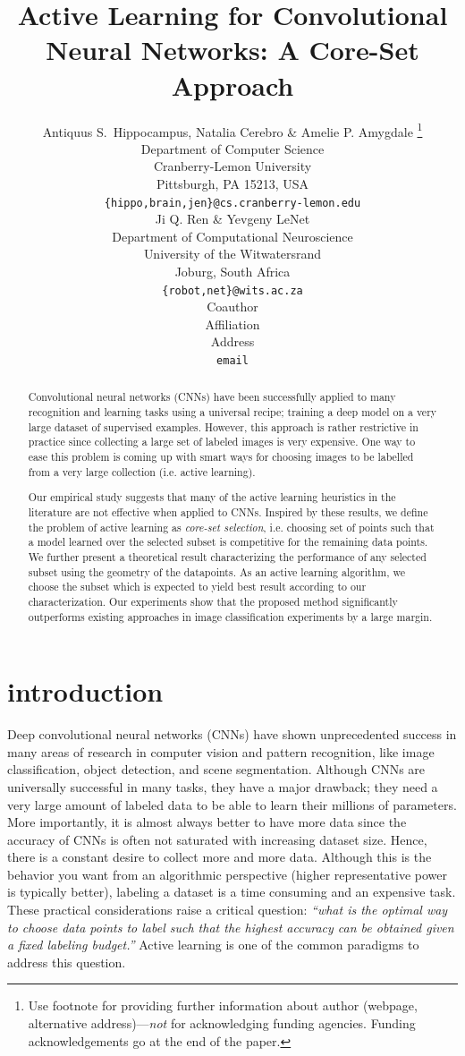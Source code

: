 \documentclass{article} %
\title{Active Learning for Convolutional Neural Networks: A Core-Set Approach}
\author{Antiquus S.~Hippocampus, Natalia Cerebro \& Amelie P. Amygdale \thanks{ Use footnote for providing further information
about author (webpage, alternative address)---\emph{not} for acknowledging
funding agencies.  Funding acknowledgements go at the end of the paper.} \\
Department of Computer Science\\
Cranberry-Lemon University\\
Pittsburgh, PA 15213, USA \\
\texttt{\{hippo,brain,jen\}@cs.cranberry-lemon.edu} \\
\And
Ji Q. Ren \& Yevgeny LeNet \\
Department of Computational Neuroscience \\
University of the Witwatersrand \\
Joburg, South Africa \\
\texttt{\{robot,net\}@wits.ac.za} \\
\AND
Coauthor \\
Affiliation \\
Address \\
\texttt{email}
}
\makeatletter
\newcommand*{\ie}{i.e.\@\xspace}
\makeatother
\begin{document}
\maketitle

\begin{abstract} 
Convolutional neural networks (CNNs) have been successfully applied to many recognition and learning tasks using a universal recipe;
    training a deep model on a very large dataset of supervised examples. However, this approach is rather restrictive in practice since collecting a
    large set of labeled images is very expensive. One way to ease this problem is coming up with smart ways for choosing images to be labelled from a
    very large collection (\ie active learning).

    Our empirical study suggests that many of the active learning heuristics in the literature are not effective when applied to CNNs. Inspired by these results, we define the problem of active learning as \emph{core-set selection}, \ie choosing set of points such that a model learned over the selected subset is competitive for the remaining data points. We further present a theoretical result characterizing the performance of any selected subset using the geometry of the datapoints. As an active learning algorithm, we choose the subset which is expected to yield best result according to our characterization. Our experiments show that the proposed method significantly outperforms existing approaches in image classification experiments by a large margin. 
\end{abstract} 

\section{introduction}
Deep convolutional neural networks (CNNs) have shown unprecedented success in many areas of research in computer vision and pattern recognition, like
image classification, object detection, and scene segmentation. Although CNNs are universally successful in many tasks, they have a major drawback;
they need a very large amount of labeled data to be able to learn their millions of parameters. More importantly, it is almost always better to have
more data since the accuracy of CNNs is often not saturated with increasing dataset size. Hence, there is a constant desire to collect more and more
data. Although this is the behavior you want from an algorithmic perspective (higher representative power is typically better), labeling a dataset is
a time consuming and an expensive task. These practical considerations raise a critical question: \emph{``what is the optimal way to choose data
points to label such that the highest accuracy can be obtained given a fixed labeling budget.''} Active learning is one of the common paradigms to
address this question.
\end{document}
